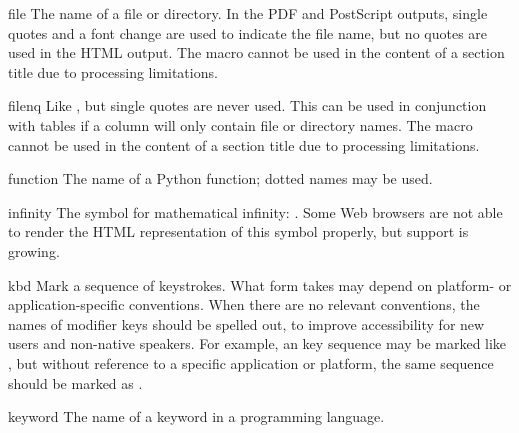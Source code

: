 \documentclass{howto}
\begin{document}
    \begin{macrodesc}{file}{}
      The name of a file or directory.  In the PDF and PostScript
      outputs, single quotes and a font change are used to indicate
      the file name, but no quotes are used in the HTML output.
       The  macro cannot be used in the
      content of a section title due to processing limitations.
    \end{macrodesc}

    \begin{macrodesc}{filenq}{}
      Like , but single quotes are never used.  This can
      be used in conjunction with tables if a column will only contain 
      file or directory names.
       The  macro cannot be used in the
      content of a section title due to processing limitations.
    \end{macrodesc}

    \begin{macrodesc}{function}{}
      The name of a Python function; dotted names may be used.
    \end{macrodesc}

    \begin{macrodesc}{infinity}{}
      The symbol for mathematical infinity: \infinity.  Some Web
      browsers are not able to render the HTML representation of this
      symbol properly, but support is growing.
    \end{macrodesc}

    \begin{macrodesc}{kbd}{}
      Mark a sequence of keystrokes.  What form 
      takes may depend on platform- or application-specific
      conventions.  When there are no relevant conventions, the names
      of modifier keys should be spelled out, to improve accessibility
      for new users and non-native speakers.  For example, an
       key sequence may be marked like
      , but without reference to a specific
      application or platform, the same sequence should be marked as
      .
    \end{macrodesc}

    \begin{macrodesc}{keyword}{}
      The name of a keyword in a programming language.
    \end{macrodesc}
\end{document}
